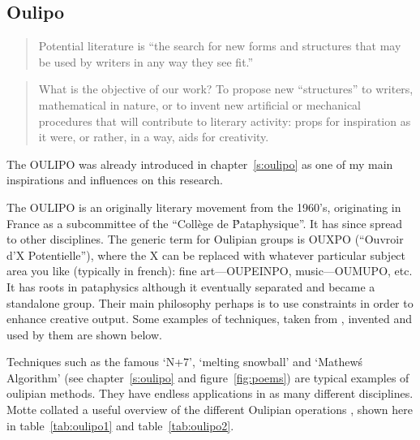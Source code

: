 \subsection{Oulipo}
\label{s:patalipo}

\begin{quotation}
  Potential literature is ``the search for new forms and structures that may be used by writers in any way they see fit.'' 
\end{quotation}


\begin{quotation}
  What is the objective of our work? To propose new ``structures'' to writers, mathematical in nature, or to invent new artificial or mechanical procedures that will contribute to literary activity: props for inspiration as it were, or rather, in a way, aids for creativity. 
\end{quotation}

The \ac{OULIPO} was already introduced in chapter~\ref{s:oulipo} as one of my main inspirations and influences on this research.

The \ac{OULIPO} is an originally literary movement from the 1960's, originating in France as a subcommittee of the ``Coll\`{e}ge de \'Pataphysique''. It has since spread to other disciplines. The generic term for Oulipian groups is OUXPO (``Ouvroir d'X Potentielle''), where the X can be replaced with whatever particular subject area you like (typically in french): fine art---OUPEINPO, music---OUMUPO, etc. It has roots in pataphysics although it eventually separated and became a standalone group. Their main philosophy perhaps is to use constraints in order to enhance creative output. Some examples of techniques, taken from \autocite{Mathews2005}, invented and used by them are shown below.

Techniques such as the famous `N+7', `melting snowball' and `Mathew\'s Algorithm' (see chapter~\ref{s:oulipo} and figure~\ref{fig:poems}) are typical examples of oulipian methods. They have endless applications in as many different disciplines. Motte collated a useful overview of the different Oulipian operations \citeyear[p.44--45]{Motte2007}, shown here in table~\ref{tab:oulipo1} and table~\ref{tab:oulipo2}.

